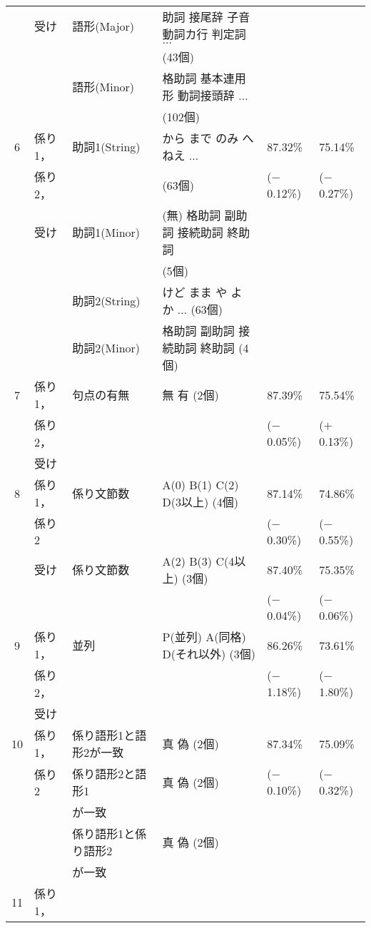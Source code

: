 \begin{table}[htbp]
\begin{center}
\begin{tabular}[c]{|c|l|l|l|l|l|}
      & 受け & 語形(Major) & 助詞 接尾辞 子音動詞カ行 判定詞 $\ldots$ & & \\
      & & & \q\q\q\q\q\q (43個) & & \\
      & & 語形(Minor) & 格助詞 基本連用形 動詞接頭辞 $\ldots$ & & \\
      & & & \q\q\q\q\q\q (102個) & & \\
      \hline
      6 & 係り1，
      & 助詞1(String) & から まで のみ へ ねえ $\ldots$ & 87.32\% & 75.14\% \\
      & 係り2， & & \q\q\q\q\q\q (63個) & ($-$0.12\%) & ($-$0.27\%) \\
      & 受け & 助詞1(Minor) & (無) 格助詞 副助詞 接続助詞 終助詞 & & \\
      & & & \q\q\q\q\q\q (5個) & & \\
      & & 助詞2(String) & けど まま や よ か $\ldots$ (63個) & & \\
      & & 助詞2(Minor) & 格助詞 副助詞 接続助詞 終助詞 (4個) & & \\
      \hline
      7 & 係り1，
      & 句点の有無 & 無 有 (2個) & 87.39\% & 75.54\% \\
      & 係り2， & & & ($-$0.05\%) & ($+$0.13\%) \\
      & 受け & & & & \\
      \hline
      8 & 係り1，
      & 係り文節数 & A(0) B(1) C(2) D(3以上) (4個) & 87.14\% & 74.86\% \\
      & 係り2 & & & ($-$0.30\%) & ($-$0.55\%) \\
      \cline{2-6}
      & 受け 
      & 係り文節数 & A(2) B(3) C(4以上) (3個) & 87.40\% & 75.35\% \\
      & & & & ($-$0.04\%) & ($-$0.06\%) \\
      \hline
      9 & 係り1，
      & 並列 & P(並列) A(同格) D(それ以外) (3個) & 86.26\% & 73.61\% \\
      & 係り2， & & & ($-$1.18\%) & ($-$1.80\%) \\
      & 受け & & & & \\
      \hline
      10 & 係り1，
      & 係り語形1と語形2が一致 & 真 偽 (2個) & 87.34\% & 75.09\% \\
      & 係り2 & 係り語形2と語形1 & 真 偽 (2個) & ($-$0.10\%) & ($-$0.32\%) \\
      & & が一致 & & & \\
      & & 係り語形1と係り語形2 & 真 偽 (2個) & & \\
      & & が一致 & & & \\
      \hline
      11 & 係り1，

\end{tabular}
\end{center}
\end{table}
